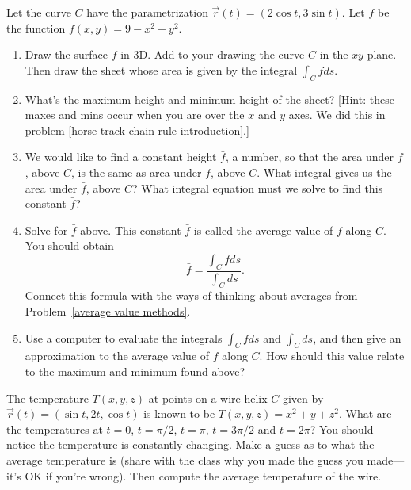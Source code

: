 \begin{problem}\label{Average Value intro}%
%
 Let the curve $C$ have the parametrization $\vec r(t) = (2\cos t, 3\sin t)$.  Let $f$ be the function $f(x,y)=9-x^2-y^2$.    \begin{enumerate}
  \item Draw the surface $f$ in 3D.  Add to your drawing the curve $C$ in the $xy$ plane. Then draw the sheet whose area is given by the integral $\int_C f ds$. 
  \item What's the maximum height and minimum height of the sheet? [Hint: these maxes and mins occur when you are over the $x$ and $y$ axes. We did this in problem \ref{horse track chain rule introduction}.]
  \item We would like to find a constant height $\bar f$, a number, so that the area under $f$, above $C$, is the same as area under $\bar f$, above $C$. What integral gives us the area under $\bar f$, above $C$?  What integral equation must we solve to find this constant $\bar f$?
  \item {}%
Solve for $\bar f$ above. This constant $\bar f$ is called the average value of $f$ along $C$. You should obtain 
$$\bar f = \frac{\int_C f ds}{\int_C ds}.$$
Connect this formula with the ways of thinking about averages from Problem~\ref{average value methods}.

  \item Use a computer to evaluate the integrals $\int_C f ds$ and $\int_C ds$, and then give an approximation to the average value of $f$ along $C$. How should this value relate to the maximum and minimum found above?
 \end{enumerate}
\end{problem}

\begin{problem}%
 The temperature $T(x,y,z)$ at points on a wire helix $C$ given by $\vec r(t) = (\sin t, 2t, \cos t)$ is known to be $T(x,y,z)=x^2+y+z^2$. What are the temperatures at $t=0$, $t=\pi/2$, $t=\pi$, $t=3\pi/2$ and $t=2\pi$?  You should notice the temperature is constantly changing.  Make a guess as to what the average temperature is (share with the class why you made the guess you made---it's OK if you're wrong). Then compute the average temperature of the wire.
\end{problem}
